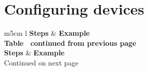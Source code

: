 \documentclass[11pt,a4paper]{report}
\begin{document}
    \section{Configuring devices}
        \begin{flushleft}
                \begin{center}
                    \begin{longtable}{ m{5cm} l }
                        \textbf{Steps} & \textbf{Example} \\
                        \hline
                        \endfirsthead
                        {{\bfseries Table \thetable\ continued from previous page}} \\
                        \textbf{Steps} & \textbf{Example} \\
                        \hline
                        \endhead
                        \hline Continued on next page \\
                        \endfoot
                        \endlastfoot


\end{longtable}
\end{center}
\end{flushleft}
\end{document}

